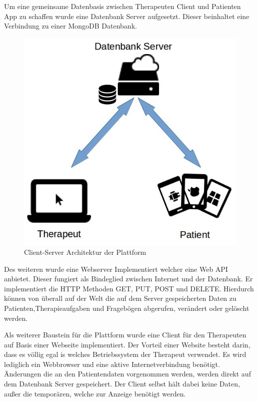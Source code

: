 Um eine gemeinsame Datenbasis zwischen Therapeuten Client und Patienten App zu schaffen wurde eine Datenbank Server aufgesetzt. Dieser beinhaltet eine Verbindung zu einer MongoDB Datenbank.
\begin{figure}[H]
	\centering
	\includegraphics[scale=0.5]{images/clientServerArchitektur}
	\caption[Client-Server Architektur der Plattform]{Client-Server Architektur der Plattform}
	\label{ClientServerArchitektur}
\end{figure}
Des weiteren wurde eine Webserver Implementiert welcher eine Web API anbietet. Dieser fungiert als Bindeglied zwischen Internet und der Datenbank. Er implementiert die HTTP Methoden GET, PUT, POST und DELETE. Hierdurch können von überall auf der Welt die auf dem Server gespeicherten Daten zu Patienten,Therapieaufgaben und Fragebögen abgerufen, verändert oder gelöscht werden.

Als weiterer Baustein für die Plattform wurde eine Client für den Therapeuten auf Basis einer Webseite implementiert. Der Vorteil einer Website besteht darin, dass es völlig egal is welches Betriebssystem der Therapeut verwendet. Es wird lediglich ein Webbrowser und eine aktive Internetverbindung benötigt. Änderungen die an den Patientendaten vorgenommen werden, werden direkt auf dem Datenbank Server gespeichert. Der Client selbst hält dabei keine Daten, außer die temporären, welche zur Anzeige benötigt werden.

